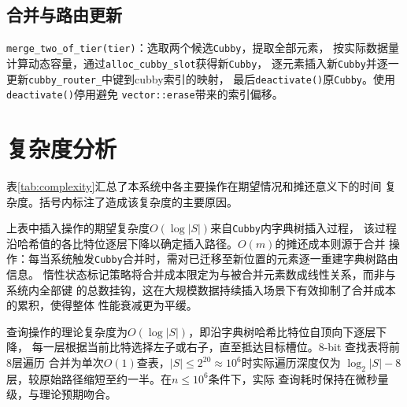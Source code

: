 \documentclass[
    type = bachelor,
    fontset = win,
    decl-page = true,
  ]{njuthesis}
\begin{document}
\subsection{合并与路由更新}

\texttt{merge\_two\_of\_tier(tier)}：选取两个候选\texttt{Cubby}，提取全部元素，
按实际数据量计算动态容量，通过\texttt{alloc\_cubby\_slot}获得新\texttt{Cubby}，
逐元素插入新\texttt{Cubby}并逐一更新\texttt{cubby\_router\_}中键到cubby索引的映射，
最后\texttt{deactivate()}原\texttt{Cubby}。使用\texttt{deactivate()}停用避免
\texttt{vector::erase}带来的索引偏移。

\section{复杂度分析}

表\ref{tab:complexity}汇总了本系统中各主要操作在期望情况和摊还意义下的时间
复杂度。括号内标注了造成该复杂度的主要原因。

\begin{table}[H]
\centering
{}
\caption{复杂度汇总}
\label{tab:complexity}
\end{table}

\noindent 上表中插入操作的期望复杂度$O(\log |S|)$来自\texttt{Cubby}内字典树插入过程，
该过程沿哈希值的各比特位逐层下降以确定插入路径。$O(m)$的摊还成本则源于合并
操作：每当系统触发\texttt{Cubby}合并时，需对已迁移至新位置的元素逐一重建字典树路由信息。
惰性状态标记策略将合并成本限定为与被合并元素数成线性关系，而非与系统内全部键
的总数挂钩，这在大规模数据持续插入场景下有效抑制了合并成本的累积，使得整体
性能衰减更为平缓。

查询操作的理论复杂度为$O(\log |S|)$，即沿字典树哈希比特位自顶向下逐层下降，
每一层根据当前比特选择左子或右子，直至抵达目标槽位。8-bit 查找表将前8层遍历
合并为单次$O(1)$查表，$|S| \leq 2^{20} \approx 10^6$时实际遍历深度仅为
$\log_2|S| - 8$层，较原始路径缩短至约一半。在$n \leq 10^6$条件下，实际
查询耗时保持在微秒量级，与理论预期吻合。
\end{document}
